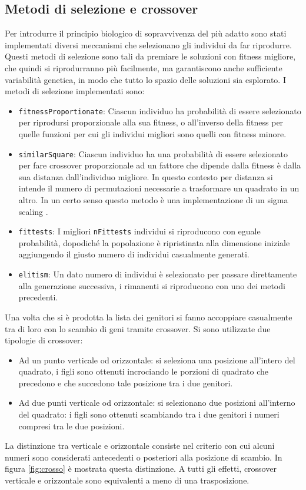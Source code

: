 \documentclass[italian,twoside,twocolumn]{article}
\begin{document}
\subsection{Metodi di selezione e crossover}
Per introdurre il principio biologico di sopravvivenza del più adatto sono stati implementati diversi meccanismi che selezionano gli individui da far riprodurre. Questi metodi di selezione sono tali da premiare le soluzioni con fitness migliore, che quindi si riprodurranno più facilmente, ma garantiscono anche sufficiente variabilità genetica, in modo che tutto lo spazio delle soluzioni sia esplorato. I metodi di selezione implementati sono:
\begin{itemize}
	\item \texttt{fitnessProportionate}: Ciascun individuo ha probabilità di essere selezionato per riprodursi proporzionale alla sua fitness, o all'inverso della fitness per quelle funzioni per cui gli individui migliori sono quelli con fitness minore.  
	\item \texttt{similarSquare}: Ciascun individuo ha una probabilità di essere selezionato per fare crossover proporzionale ad un fattore che dipende dalla fitness è dalla sua distanza dall'individuo migliore. In questo contesto per distanza si intende il numero di permutazioni necessarie a trasformare un quadrato in un altro. In un certo senso questo metodo è una implementazione di un sigma scaling \cite{Mitchell:1998}.
	\item \texttt{fittests}: I migliori \texttt{nFittests} individui si riproducono con eguale probabilità, dopodiché la popolazione è ripristinata alla dimensione iniziale aggiungendo il giusto numero di individui casualmente generati. 
	\item \texttt{elitism}: Un dato numero di individui è selezionato per passare direttamente alla generazione successiva, i rimanenti si riproducono con uno dei metodi precedenti.
\end{itemize}
Una volta che si è prodotta la lista dei genitori si fanno accoppiare casualmente tra di loro con lo scambio di geni tramite crossover. Si sono utilizzate due tipologie di crossover:
\begin{itemize}
	\item Ad un punto verticale od orizzontale: si seleziona una posizione all'intero del quadrato, i figli sono ottenuti incrociando le porzioni di quadrato che precedono e che succedono tale posizione tra i due genitori. 
	\item Ad due punti verticale od orizzontale: si selezionano due posizioni all'interno del quadrato: i figli sono ottenuti scambiando tra i due genitori i numeri compresi tra le due posizioni.
\end{itemize}
La distinzione tra verticale e orizzontale consiste nel criterio con cui alcuni numeri sono considerati antecedenti o posteriori alla posizione di scambio. In figura \ref{fig:crosso} è mostrata questa distinzione. A tutti gli effetti, crossover verticale e orizzontale sono equivalenti a meno di una trasposizione. 
\end{document}

